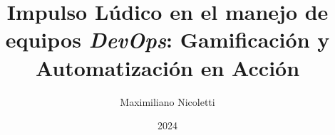 \documentclass[journal]{IEEEtran}
\begin{document}
\title{Impulso Lúdico en el manejo de equipos \textit{DevOps}: Gamificación y Automatización en Acción}

\author{Maximiliano Nicoletti}

\date{2024}

\maketitle


%
%
\end{document}
